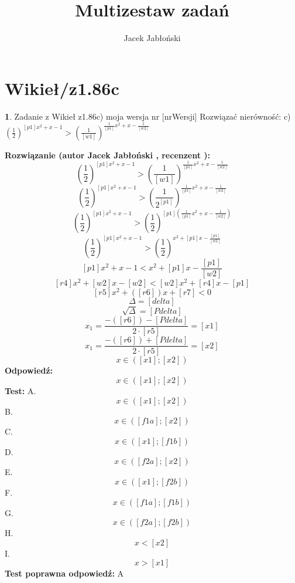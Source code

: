 \documentclass[12pt, a4paper]{article}
\title{Multizestaw zadań}
\author{Jacek Jabłoński}
\date{}
\theoremstyle{definition} %
\newtheorem{zad}{}
\newcommand{\kategoria}[1]{\section{#1}} %
\newcommand{\zadStart}[1]{\begin{zad}#1\newline} %
\newcommand{\zadStop}{\end{zad}}   %
\newcommand{\rozwStart}[2]{\noindent \textbf{Rozwiązanie (autor #1 , recenzent #2): }\newline} %
\newcommand{\rozwStop}{\newline}                                            %
\newcommand{\odpStart}{\noindent \textbf{Odpowiedź:}\newline}    %
\newcommand{\odpStop}{\newline}                                             %
\newcommand{\testStart}{\noindent \textbf{Test:}\newline} %
\newcommand{\testStop}{\newline} %
\newcommand{\kluczStart}{\noindent \textbf{Test poprawna odpowiedź:}\newline} %
\newcommand{\kluczStop}{\newline} %
\begin{document}
\maketitle


\kategoria{Wikieł/z1.86c}
\zadStart{Zadanie z Wikieł z1.86c) moja wersja nr [nrWersji]}
Rozwiązać nierówność:
c) $(\frac{1}{2})^{[p1]x^2+ x-1} > (\frac{1}{[w1]})^{\frac{1}{[p1]}x^2 +x-\frac{1}{[w2]}}$
\zadStop
\rozwStart{Jacek Jabłoński}{}
$$(\frac{1}{2})^{[p1]x^2+ x-1} > (\frac{1}{[w1]})^{\frac{1}{[p1]}x^2 +x-\frac{1}{[w2]}}$$
$$(\frac{1}{2})^{[p1]x^2+ x-1} > (\frac{1}{2^{[p1]}})^{\frac{1}{[p1]}x^2 +x-\frac{1}{[w2]}}$$
$$(\frac{1}{2})^{[p1]x^2+ x-1} > (\frac{1}{2})^{[p1](\frac{1}{[p1]}x^2 +x-\frac{1}{[w2]})}$$
$$(\frac{1}{2})^{[p1]x^2+ x-1} > (\frac{1}{2})^{x^2 +[p1]x- \frac{[p1]}{[w2]}}$$
$$[p1]x^2+ x-1 < x^2 +[p1]x-\frac{[p1]}{[w2]}$$
$$[r4]x^2 + [w2]x -[w2] < [w2]x^2 + [r4]x - [p1]$$
$$[r5]x^2 + ([r6])x + [r7] < 0$$
$$\Delta = [delta]$$
$$\sqrt{\Delta} = [Pdelta]$$
$$x_1=\frac{-([r6])-[Pdelta]}{2 \cdot [r5]} = [x1] $$
$$x_1=\frac{-([r6])+[Pdelta]}{2 \cdot [r5]} = [x2] $$
$$x \in ([x1] ; [x2])$$
\rozwStop
\odpStart
$$x \in ([x1] ; [x2])$$
\odpStop
\testStart
A. $$x \in ([x1] ; [x2])$$
B. $$x \in ([f1a] ; [x2])$$
C. $$x \in ([x1] ; [f1b])$$
D. $$x \in ([f2a] ; [x2])$$
E. $$x \in ([x1] ; [f2b])$$
F. $$x \in ([f1a] ; [f1b])$$
G. $$x \in ([f2a] ; [f2b])$$
H. $$x < [x2]$$
I. $$x > [x1]$$
\testStop
\kluczStart
A
\kluczStop
\end{document}

